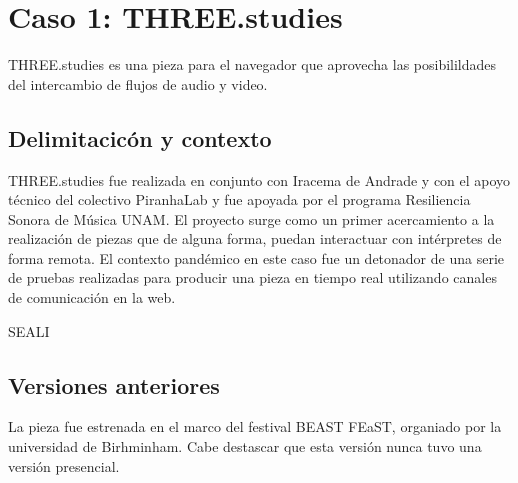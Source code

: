  \chapter{Caso 1: THREE.studies}

 THREE.studies es una pieza para el navegador que aprovecha las posibilildades del intercambio de flujos de audio y video. 

\section{Delimitacicón y contexto}

THREE.studies fue realizada en conjunto con Iracema de Andrade y con el apoyo técnico del colectivo PiranhaLab y fue apoyada por el programa Resiliencia Sonora de Música UNAM. El proyecto surge como un primer acercamiento a la realización de piezas que de alguna forma, puedan interactuar con intérpretes de forma remota. El contexto pandémico en este caso fue un detonador de una serie de pruebas realizadas para producir una pieza en tiempo real utilizando canales de comunicación en la web. 

SEALI 

\section{Versiones anteriores} 

La pieza fue estrenada en el marco del festival BEAST FEaST, organiado por la universidad de Birhminham. Cabe destascar que esta versión nunca tuvo una versión presencial. 

